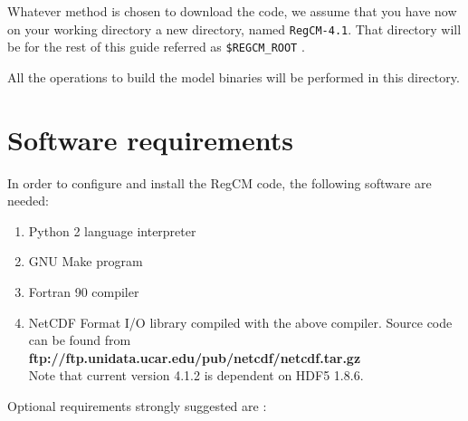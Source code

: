 %
%

Whatever method is chosen to download the code, we assume that you have now
on your working directory a new directory, named \verb=RegCM-4.1=.
That directory will be for the rest of this guide referred as 
\verb=$REGCM_ROOT= .

All the operations to build the model binaries will be performed in this
directory.

\section{Software requirements}

In order to configure and install the RegCM code, the following software are
needed:

\begin{enumerate}
\item Python 2 language interpreter
\item GNU Make program
\item Fortran 90 compiler
\item NetCDF Format I/O library compiled with the above compiler.
   Source code can be found from \\
{\bf ftp://ftp.unidata.ucar.edu/pub/netcdf/netcdf.tar.gz} \\
Note that current version 4.1.2 is dependent on HDF5 1.8.6.
\end{enumerate}

Optional requirements strongly suggested are :

